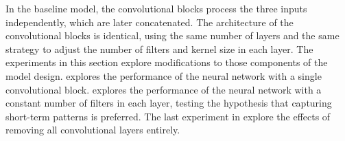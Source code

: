 
In the baseline model, the convolutional blocks process the
three inputs independently, which are later concatenated.
The architecture of the convolutional blocks is identical,
using the same number of layers and the same strategy to
adjust the number of filters and kernel size in each layer.
The experiments in this section explore modifications to
those components of the model design.
 explores the
performance of the neural network with a single
convolutional block. 
explores the performance of the neural network with a
constant number of filters in each layer, testing the
hypothesis that capturing short-term patterns is preferred.
The last experiment in 
explore the effects of removing all convolutional layers
entirely.
